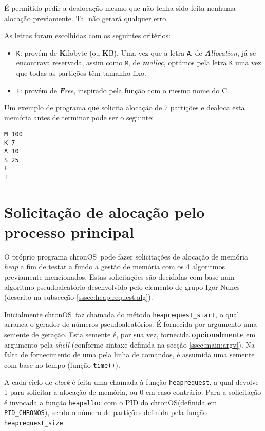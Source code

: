 \documentclass[10pt,oneside]{estiloUBI}
\newcommand{\chronOS}{\textsf{chronOS}}
\begin{document}
	É permitido pedir a dealocação mesmo que não tenha sido feita nenhuma alocação previamente. Tal não gerará qualquer erro.
	
	As letras foram escolhidas com os seguintes critérios:
	
	\begin{itemize}
		\item \verb|K|: provém de \textbf{K}ilobyte (ou \textbf{K}B). Uma vez que a letra \verb|A|, de \textit{\textbf{A}llocation}, já se encontrava reservada, assim como \verb|M|, de \textit{\textbf{m}alloc}, optámos pela letra \verb|K| uma vez que todas as partições têm tamanho fixo.
		
		\item \verb|F|: provém de \textit{\textbf{F}ree}, inspirado pela função com o mesmo nome do C.
	\end{itemize}

	Um exemplo de programa que solicita alocação de 7 partições e dealoca esta memória antes de terminar pode ser o seguinte:
	
	\begin{verbatim}
M 100
K 7
A 10
S 25
F
T
	\end{verbatim}
	
	
	\section{Solicitação de alocação pelo processo principal}
	\label{ssec:heap:request}
	
	O próprio programa \chronOS~pode fazer solicitações de alocação de memória \textit{heap} a fim de testar a fundo a gestão de memória com os 4 algoritmos previamente mencionados. Estas solicitações são decididas com base num algoritmo pseudoaleatório desenvolvido pelo elemento de grupo Igor Nunes (descrito na subsecção \ref{sssec:heap:request:alg}).
	
	Inicialmente \chronOS~faz chamada do método \verb|heaprequest_start|, o qual arranca o gerador de números pseudoaleatórios. É fornecida por argumento uma semente de geração. Esta semente é, por sua vez, fornecida \textbf{opcionalmente} em argumento pela \textit{shell} (conforme sintaxe definida na secção \ref{ssec:main:argv}). Na falta de fornecimento de uma pela linha de comandos, é assumida uma semente com base no tempo (função \verb|time()|).
	
	A cada ciclo de \textit{clock} é feita uma chamada à função \verb|heaprequest|, a qual devolve 1 para solicitar a alocação de memória, ou 0 em caso contrário. Para a solicitação é invocada a função \verb|heapalloc| com o PID do \chronOS (definida em \verb|PID_CHRONOS|), sendo o número de partições definida pela função \verb|heaprequest_size|.
	
\end{document}
